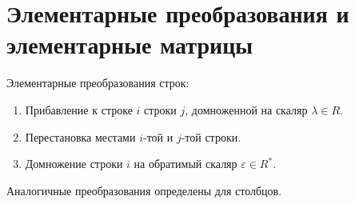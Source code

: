 \section{Элементарные преобразования и элементарные матрицы}
Элементарные преобразования строк:
\begin{enumerate}
    \item Прибавление к строке $i$ строки $j$, домноженной на скаляр $\lambda \in R$.
    \item Перестановка местами $i$-той и $j$-той строки.
    \item Домножение строки $i$ на обратимый скаляр $\varepsilon \in R^*$.
\end{enumerate}

\begin{notice}
    Аналогичные преобразования определены для столбцов.
\end{notice}

